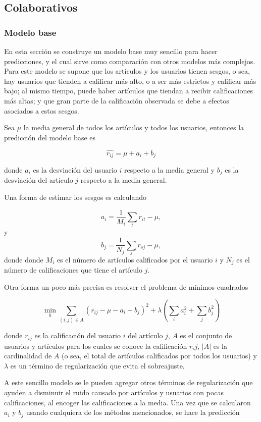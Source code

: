 \subsection{Colaborativos}

\subsubsection{Modelo base}

En esta sección se construye un modelo base muy sencillo para hacer predicciones, y el cual sirve como comparación con otros modelos más complejos. Para este modelo se supone que los artículos y los usuarios tienen sesgos, o sea, hay usuarios que tienden a calificar más alto, o a ser más estrictos y calificar más bajo; al mismo tiempo, puede haber artículos que tiendan a recibir calificaciones más altas; y que gran parte de la calificación observada se debe a efectos asociados a estos sesgos.

Sea $\mu$ la media general de todos los artículos y todos los usuarios, entonces la predicción del modelo base es

\[
\hat{r_{ij}} = \mu + a_i + b_j
\]

donde $a_i$ es la desviación del usuario $i$ respecto a la media general y $b_j$ es la desviación del artículo $j$ respecto a la media general.

Una forma de estimar los sesgos es calculando

\[
a_i = \frac{1}{M_i} \sum_t r_{it} - \mu,
\]
y 
\[
b_j = \frac{1}{N_j} \sum_s r_{sj} - \mu,
\]
donde donde $M_i$ es el número de artículos calificados por el usuario $i$ y $N_j$ es el número de calificaciones que tiene el artículo $j$.

Otra forma un poco más precisa es resolver el problema de mínimos cuadrados

\[
\min_{b} \sum_{(i, j) \in A} \left( r_{ij} - \mu - a_i - b_j \right) ^2 + \lambda \left( \sum_{i} a_i^2 + \sum_{j} b_j^2 \right)
\]

donde $r_{ij}$ es la calificación del usuario $i$ del artículo $j$, $A$ es el conjunto de usuarios y artículos para los cuales se conoce la calificación $r_ij$, $ \vert A \vert$ es la cardinalidad de $A$ (o sea, el total de artículos calificados por todos los usuarios) y $\lambda$ es un término de regularización que evita el sobreajuste.

A este sencillo modelo se le pueden agregar otros términos de regularización que ayuden a disminuir el ruido causado por artículos y usuarios con pocas calificaciones, al encoger las calificaciones a la media. Una vez que se calcularon $a_i$ y $b_j$ usando cualquiera de los métodos mencionados, se hace la predicción

